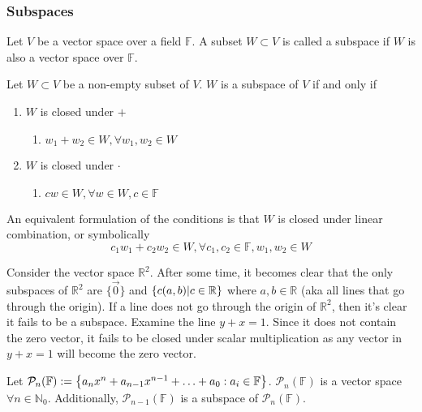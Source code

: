 \documentclass[../notes.tex]{subfiles}
\begin{document}
\subsubsection{Subspaces}

\begin{definition}[Subspace]
	Let $V$ be a vector space over a field $\mathbb{F}$. A subset $W \subset V$ is called a subspace if $W$ is also a vector space over $\mathbb{F}$.
\end{definition}

\begin{theorem}
	Let $W \subset V$ be a non-empty subset of $V$. $W$ is a subspace of $V$ if and only if
	\begin{enumerate}
		\item $W$ is closed under $+$
		\begin{enumerate}
			\item[] $w_1 + w_2 \in W, \forall w_1,w_2 \in W$
		\end{enumerate}
		\item $W$ is closed under $\cdot$
		\begin{enumerate}
			\item[] $cw \in W, \forall w\in W, c \in \mathbb{F}$
		\end{enumerate}
	\end{enumerate}
	An equivalent formulation of the conditions is that $W$ is closed under linear combination, or symbolically
	\[
		c_1 w_1 + c_2 w_2 \in W, \forall c_1,c_2 \in \mathbb{F}, w_1, w_2 \in W
	\]
\end{theorem}

Consider the vector space $\mathbb{R}^2$. After some time, it becomes clear that the only subspaces of $\mathbb{R}^2$ are $\{\vec{0}\}$ and $\qty{c(a,b) | c \in \mathbb{R}}$ where $a,b \in \mathbb{R}$ (aka all lines that go through the origin). If a line does not go through the origin of $\mathbb{R}^2$, then it's clear it fails to be a subspace. Examine the line $y + x = 1$. Since it does not contain the zero vector, it fails to be closed under scalar multiplication as any vector in $y + x = 1$ will become the zero vector.

\begin{example}
	Let $\mathcal{P}_n(\mathbb{F}) := \qty{a_n x^n + a_{n-1} x^{n-1} + \ldots + a_0 : a_i \in \mathbb{F}}$. $\mathcal{P}_n(\mathbb{F})$ is a vector space $\forall n \in \mathbb{N}_0$. Additionally, $\mathcal{P}_{n-1}(\mathbb{F})$ is a subspace of $\mathcal{P}_n(\mathbb{F})$.
\end{example}
\end{document}
